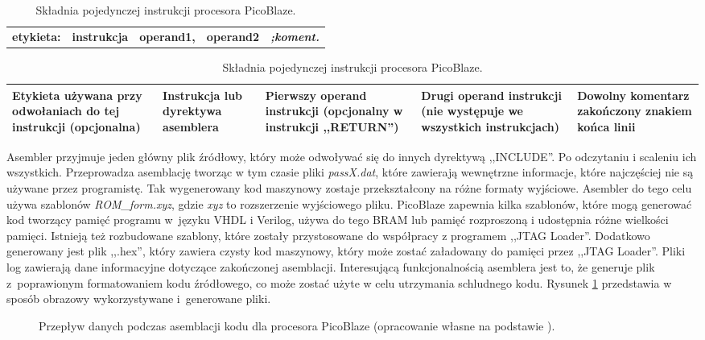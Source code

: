 \begin{table}[h]
	\begin{center}		
		{\large 
		\begin{tabular}{|p{2.75cm}p{2.75cm}p{2.75cm}p{2.75cm}p{2.75cm}|}
			\hline
			\textbf{etykieta:} & \textbf{instrukcja} & \textbf{operand1,} & \textbf{operand2} & \textbf{\textit{;koment.}} \\
		\end{tabular}}
		{\footnotesize
			\begin{tabular}{|p{2.75cm}|p{2.75cm}|p{2.75cm}|p{2.75cm}|p{2.75cm}|}
				Etykieta używana przy odwołaniach do tej instrukcji (opcjonalna)  &
				Instrukcja lub dyrektywa asemblera  &
				Pierwszy operand instrukcji (opcjonalny w instrukcji ,,RETURN'')  &
				Drugi operand instrukcji (nie występuje we wszystkich instrukcjach)  &
				Dowolny komentarz zakończony znakiem końca linii  \\
				\hline
			\end{tabular}}
	\caption{ Składnia pojedynczej instrukcji procesora PicoBlaze. }
	\label{tab:asm_instr}
	\end{center}
\end{table}


Asembler przyjmuje jeden główny plik źródłowy, który może odwoływać się do innych dyrektywą ,,INCLUDE''. Po odczytaniu i scaleniu ich wszystkich. Przeprowadza asemblację tworząc w tym czasie pliki \textit{passX.dat}, które zawierają wewnętrzne informacje, które najczęściej nie są używane przez programistę. Tak wygenerowany kod maszynowy zostaje przekształcony na różne formaty wyjściowe. Asembler do tego celu używa szablonów \textit{ROM\_form.xyz}, gdzie \textit{xyz} to rozszerzenie wyjściowego pliku. PicoBlaze zapewnia kilka szablonów, które mogą generować kod tworzący pamięć programu w~języku VHDL i Verilog, używa do tego BRAM lub pamięć rozproszoną i udostępnia różne wielkości pamięci. Istnieją też rozbudowane szablony, które zostały przystosowane do współpracy z programem ,,JTAG Loader''. Dodatkowo generowany jest plik ,,.hex'', który zawiera czysty kod maszynowy, który może zostać załadowany do pamięci przez ,,JTAG Loader''. Pliki log zawierają dane informacyjne dotyczące zakończonej asemblacji. Interesującą funkcjonalnością asemblera jest to, że generuje plik z~poprawionym formatowaniem kodu źródłowego, co może zostać użyte w celu utrzymania schludnego kodu. Rysunek \ref{assemblerFiles} przedstawia w sposób obrazowy wykorzystywane i~generowane pliki.


\begin{figure}[htb]
	\centering
	\caption{ Przepływ danych podczas asemblacji kodu dla procesora PicoBlaze (opracowanie własne na podstawie \cite{kcpsm3}). }
	\label{assemblerFiles}
\end{figure}


